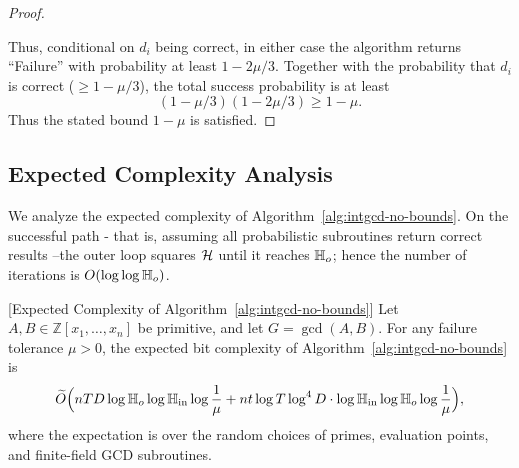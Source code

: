 \documentclass{article}
\numberwithin{equation}{section}
\begin{document}
\begin{proof}
\begin{enumerate}
\end{enumerate}

Thus, conditional on $d_i$ being correct, in either case the algorithm returns ``Failure'' with probability at least $1 - 2\mu/3$. Together with the probability that $d_i$ is correct ($\ge 1 - \mu/3$), the total success probability is at least
\[
(1 - \mu/3)(1 - 2\mu/3) \ge 1 - \mu.
\]
Thus the stated bound $1-\mu$ is satisfied.
%
\end{proof}


\subsection*{Expected Complexity Analysis}


We analyze the expected complexity of Algorithm~\ref{alg:intgcd-no-bounds}. 
%
On the successful path - that is, assuming all probabilistic subroutines return correct results --the outer loop squares ${\mathcal{H}}$ until it reaches $\mathbb{H}_{o}$; hence the number of iterations is $O(\log\log \mathbb{H}_{o})$.



\begin{theorem}\label{thm:intgcd-no-bounds-complexity}[Expected Complexity of Algorithm~\ref{alg:intgcd-no-bounds}]
Let $A, B \in \mathbb{Z}[x_1,\dots,x_n]$ be primitive, and let $G = \gcd(A,B)$. 
For any failure tolerance $\mu > 0$, the expected bit complexity of Algorithm~\ref{alg:intgcd-no-bounds} is
\[
\widetilde{O}\Bigl(
nTD\log\mathbb{H}_{o}\log\mathbb{H}_{\rm in}\log\frac{1}{\mu}
+ n t \log T\log^4 D \cdot \log \mathbb{H}_{\rm in} \log\mathbb{H}_{o}\log\frac{1}{\mu}
\Bigr),
\]
where the expectation is over the random choices of primes, evaluation points, and finite-field GCD subroutines.
\end{theorem}
\end{document}
